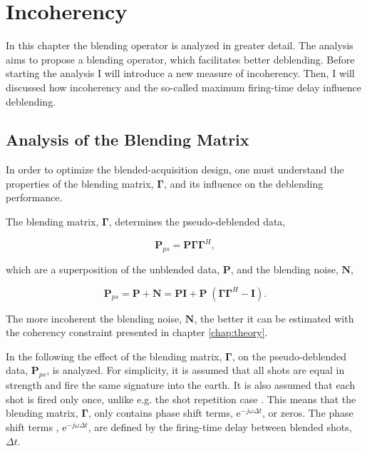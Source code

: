 \chapter{Incoherency} \label{chap:Incoherency}

In this chapter the blending operator is analyzed in greater detail. The analysis aims to propose a blending operator, which facilitates better deblending. Before starting the analysis I will introduce a new measure of incoherency. Then, I will discussed how incoherency and the so-called maximum firing-time delay influence deblending.

\section{Analysis of the Blending Matrix} \label{sec:BlendingMatrix}

In order to optimize the blended-acquisition design, one must understand the properties of the blending matrix, $\mathbf{\Gamma}$, and its influence on the deblending performance.

The blending matrix, $\mathbf{\Gamma}$, determines the pseudo-deblended data,

\begin{equation}
	\mathbf{P}_{ps} = \mathbf{P \Gamma \Gamma}^H,
	\label{eq:Ch-Theory-Pseudo-Deblended-Data}
\end{equation}

which are a superposition of the unblended data, $\mathbf{P}$, and the blending noise, $\mathbf{N}$,

\begin{equation}
	\mathbf{P}_{ps} = \mathbf{P} + \mathbf{N} = \mathbf{P I} + \mathbf{P} \; (\mathbf{\Gamma \Gamma}^H - \mathbf{I}).
	\label{eq:Ch-Theory-PseudoSuperposition}
\end{equation}

The more incoherent the blending noise, $\mathbf{N}$, the better it can be estimated with the coherency constraint presented in chapter \ref{chap:theory}.

In the following the effect of the blending matrix, $\mathbf{\Gamma}$, on the pseudo-deblended data, $\mathbf{P}_{ps}$, is analyzed. For simplicity, it is assumed that all shots are equal in strength and fire the same signature into the earth. It is also assumed that each shot is fired only once, unlike e.g. the shot repetition case \citep{Sixue}. This means that the blending matrix, $\mathbf{\Gamma}$, only contains phase shift terms, $\mathrm{e}^{-j \omega \Delta t}$, or zeros. The phase shift terms , $\mathrm{e}^{-j \omega \Delta t}$, are defined by the firing-time delay between blended shots, $\Delta t$. 

